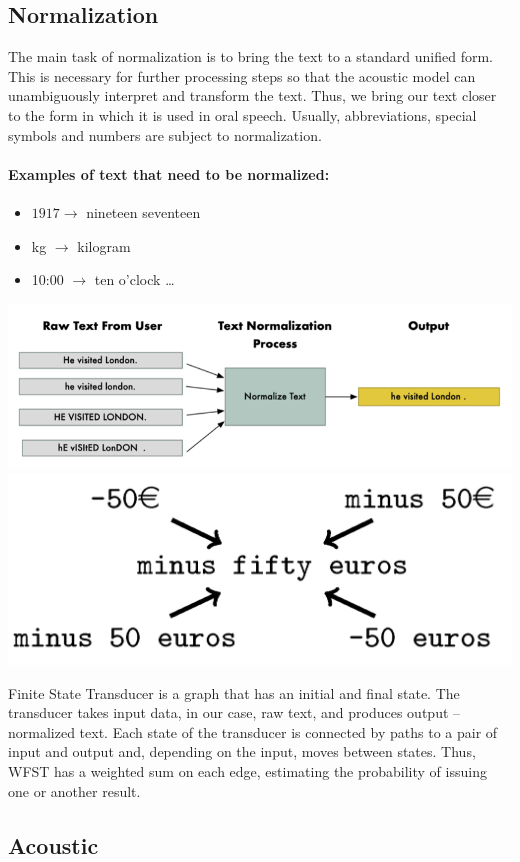 \documentclass[10pt,a4paper]{report}
\begin{document}
\subsection{Normalization}

The main task of normalization is to bring the text to a standard unified form. This is necessary for further processing steps so that the acoustic model can unambiguously interpret and transform the text. Thus, we bring our text closer to the form in which it is used in oral speech. Usually, abbreviations, special symbols and numbers are subject to normalization.
\newline

\paragraph{Examples of text that need to be normalized:}

\begin{itemize}[noitemsep]
	\item $1917 \rightarrow$ nineteen seventeen
	\item kg $\rightarrow$ kilogram
	\item 10:00 $\rightarrow$ ten o’clock \ldots 
\end{itemize}

\begin{center}
    \includegraphics[width=0.6\linewidth]{second.png}\quad\includegraphics[width=0.3\linewidth]{third.png}
\end{center}

\noindent Finite State Transducer is a graph that has an initial and final state. The transducer takes input data, in our case, raw text, and produces output – normalized text. Each state of the transducer is connected by paths to a pair of input and output and, depending on the input, moves between states. Thus, WFST has a weighted sum on each edge, estimating the probability of issuing one or another result.  


\subsection{Acoustic}
\end{document}
